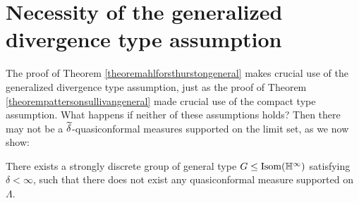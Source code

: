 \section{Necessity of the generalized divergence type assumption}
The proof of Theorem \ref{theoremahlforsthurstongeneral} makes crucial use of the generalized divergence type assumption, just as the proof of Theorem \ref{theorempattersonsullivangeneral} made crucial use of the compact type assumption. What happens if neither of these assumptions holds? Then there may not be a $\widetilde\delta$-quasiconformal measures supported on the limit set, as we now show:

\begin{proposition}
\label{propositioncounterexample}
There exists a strongly discrete group of general type $G\leq\Isom(\H^\infty)$ satisfying $\delta < \infty$, such that there does not exist any quasiconformal measure supported on $\Lambda$.
\end{proposition}
